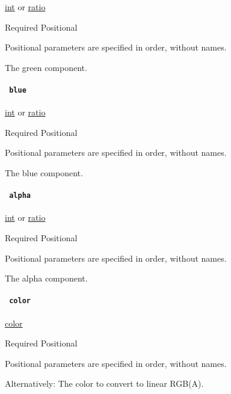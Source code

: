 \href{/docs/reference/foundations/int/}{int} {or}
\href{/docs/reference/layout/ratio/}{ratio}

{Required} {{ Positional }}

\label{definitions-linear-rgb-green-positional-tooltip}
Positional parameters are specified in order, without names.

The green component.

\paragraph{\texorpdfstring{\texttt{\ blue\ }}{ blue }}\label{definitions-linear-rgb-blue}

\href{/docs/reference/foundations/int/}{int} {or}
\href{/docs/reference/layout/ratio/}{ratio}

{Required} {{ Positional }}

\label{definitions-linear-rgb-blue-positional-tooltip}
Positional parameters are specified in order, without names.

The blue component.

\paragraph{\texorpdfstring{\texttt{\ alpha\ }}{ alpha }}\label{definitions-linear-rgb-alpha}

\href{/docs/reference/foundations/int/}{int} {or}
\href{/docs/reference/layout/ratio/}{ratio}

{Required} {{ Positional }}

\label{definitions-linear-rgb-alpha-positional-tooltip}
Positional parameters are specified in order, without names.

The alpha component.

\paragraph{\texorpdfstring{\texttt{\ color\ }}{ color }}\label{definitions-linear-rgb-color}

\href{/docs/reference/visualize/color/}{color}

{Required} {{ Positional }}

\label{definitions-linear-rgb-color-positional-tooltip}
Positional parameters are specified in order, without names.

Alternatively: The color to convert to linear RGB(A).

